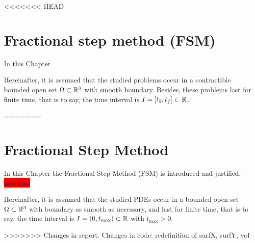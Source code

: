 
<<<<<<< HEAD
\chapter{Fractional step method (FSM)}

In this Chapter

Hereinafter, it is assumed that the studied problems occur in a contractible bounded open set $\Omega \subset \mathbb{R}^3$ with smooth boundary. Besides, these problems last for finite time, that is to say, the time interval is $I = [t_0, t_f] \subset \mathbb{R}$.




% 
=======
\chapter{Fractional Step Method}

In this Chapter the Fractional Step Method (FSM) is introduced and justified. \colorbox{red}{asdsadas}

Hereinafter, it is assumed that the studied PDEs occur in a bounded open set $\Omega \subset \mathbb{R}^3$ with boundary as smooth as necessary, and last for finite time, that is to say, the time interval is $I = (0, t_\text{max}) \subset \mathbb{R}$ with $t_\text{max} > 0$.





>>>>>>> Changes in report. Changes in code: redefinition of surfX, surfY, vol
